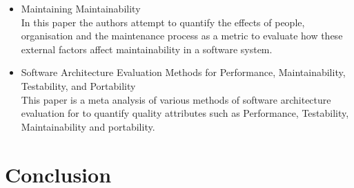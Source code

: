 \documentclass[dvips,12pt]{article}
\begin{document}
\begin{itemize}
\item Maintaining Maintainability \cite{ramage_maintaining_1998}\\
In this paper the authors attempt to quantify the effects of people, organisation and the maintenance process as a metric to evaluate how these external factors affect maintainability in a software system.

\item Software Architecture Evaluation Methods for Performance, Maintainability, Testability, and Portability \cite{mattsson_software_2006}\\
This paper is a meta analysis of various methods of software architecture evaluation for to quantify quality attributes such as Performance, Testability, Maintainability and portability.

\end{itemize}

\section{Conclusion}
\end{document}
